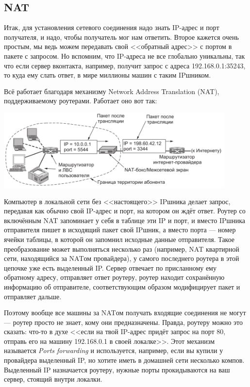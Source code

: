 \documentclass{../../text-style}
\begin{document}
\subsection{NAT}

Итак, для установления сетевого соединения надо знать IP-адрес и порт получателя, и надо, чтобы получатель мог нам ответить. Второе кажется очень простым, мы ведь можем передавать свой <<обратный адрес>> с портом в пакете с запросом. Но вспомним, что IP-адреса не все глобально уникальны, так что если сервер вконтакта, например, получит запрос с адреса 192.168.0.1:35243, то куда ему слать ответ, в мире миллионы машин с таким IPшником.

Всё работает благодаря механизму Network Address Translation (NAT), поддерживаемому роутерами. Работает оно вот так:

\begin{center}
    \includegraphics[width=0.9\textwidth]{nat.png}
\end{center}

Компьютер в локальной сети без <<настоящего>> IPшника делает запрос, передавая как обычно свой IP-адрес и порт, на котором он ждёт ответ. Роутер со включённым NAT запоминает у себя в таблице эти IP и порт, и вместо IPшника отправителя пишет в исходящий пакет свой IPшник, а вместо порта --- номер ячейки таблицы, в которой он запомнил исходные данные отправителя. Такое преобразование может выполняться несколько раз (например, NAT квартирной сети, находящийся за NATом провайдера), у самого последнего роутера в этой цепочке уже есть выделенный IP. Сервер отвечает по присланному ему обратному адресу, отправляет ответ роутеру, роутер находит сохранённую информацию об отправителе, соответствующим образом модифицирует пакет и отправляет дальше.

Поэтому вообще все машины за NATом получать входящие соединения не могут --- роутер просто не знает, кому они предназначены. Правда, роутеру можно это сказать: что-то в духе <<если на твой IP-адрес придёт запрос на порт 80, отправь его на машину 192.168.0.1 в своей локалке>>. Этот механизм называется \textit{Ports forwarding} и используется, например, если вы купили у провайдера выделенный IP, но хотите иметь в домашней сети несколько компов. Выделенный IP назначается роутеру, нужные порты прокидываются на ваш сервер, стоящий внутри локалки.
\end{document}
